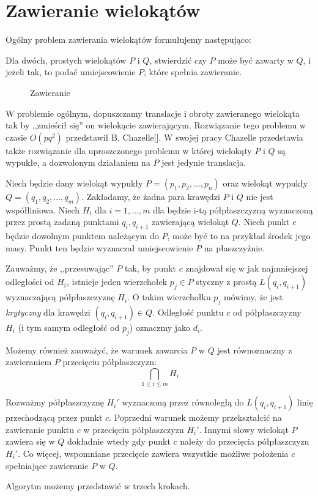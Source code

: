 \chapter{Zawieranie wielokątów}
Ogólny problem zawierania wielokątów formułujemy następująco:

\begin{problem}
  Dla dwóch, prostych wielokątów $P$ i $Q$, stwierdzić czy $P$ może
  być zawarty w $Q$, i jeżeli tak, to podać umiejscowienie $P$, które
  spełnia zawieranie.
\end{problem}

\begin{figure}[htp]
  \caption{Zawieranie}
\end{figure}

W problemie ogólnym, dopuszczamy translacje i obroty zawieranego
wielokąta tak by ,,zmieścił się'' on wielokącie
zawierającym. Rozwiązanie tego problemu w czasie $O(pq^2)$ przedstawił
B. Chazelle[]. W swojej pracy Chazelle przedstawia także rozwiązanie
dla uproszczonego problemu w której wielokąty $P$ i $Q$ są wypukłe, a
dozwolonym działaniem na $P$ jest jedynie translacja.

Niech będzie dany wielokąt wypukły $P = (p_1, p_2, \ldots, p_n)$ oraz
wielokąt wypukły $Q = (q_1, q_2, \ldots, q_m)$. Zakładamy, że żadna
para krawędzi $P$ i $Q$ nie jest współliniowa. Niech $H_i$ dla $i = 1,
\ldots, m$ dla będzie i-tą półpłaszczyzną wyznaczoną przez prostą
zadaną punktami $q_i, q_{i+1}$ zawierającą wielokąt $Q$. Niech punkt
$c$ będzie dowolnym punktem należącym do $P$, może być to na przykład
środek jego masy. Punkt ten będzie wyznaczał umiejscowienie $P$ na
płaszczyźnie.

Zauważmy, że ,,przesuwając'' $P$ tak, by punkt $c$ znajdował się w jak
najmniejszej odległości od $H_i$, istnieje jeden wierzchołek $p_j \in
P$ styczny z prostą $L(q_i, q_{i+1})$ wyznaczającą półpłaszczyznę
$H_i$. O takim wierzchołku $p_j$ mówimy, że jest \emph{krytyczny} dla
krawędzi $(q_i, q_{i+1}) \in Q$. Odległość punktu $c$ od
półpłaszczyzny $H_i$ (i tym samym odległość od $p_j$) oznaczmy jako
$d_i$.

Możemy również zauważyć, że warunek zawarcia $P$ w $Q$ jest
równoznaczny z zawieraniem $P$ przecięciu półpłaszczyzn:
\[
       \bigcap_{1 \leq i \leq m} H_i
\]

Rozważmy półpłaszczyznę $H_i'$ wyznaczoną przez równoległą do $L(q_i,
q_{i+1})$ linię przechodzącą przez punkt $c$. Poprzedni warunek możemy
przekształcić na zawieranie punktu $c$ w przecięciu półpłaszczyzn
$H_i'$. Innymi słowy wielokąt $P$ zawiera się w $Q$ dokładnie wtedy
gdy punkt $c$ należy do przecięcia półpłaszczyzn $H_i'$. Co więcej,
wspomniane przecięcie zawiera wszystkie możliwe położenia $c$
spełniające zawieranie $P$ w $Q$.

Algorytm możemy przedstawić w trzech krokach.

\begin{figure}[htp]
\begin{algorithmic}[1]
\EndProcedure
\end{algorithmic}
\end{figure}

